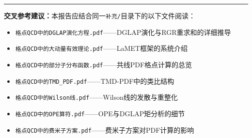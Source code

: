 \documentclass[12pt,a4paper]{ctexart}
\theoremstyle{definition}
\begin{document}
\vspace{0.5cm}
\noindent\rule{\textwidth}{0.5pt}
\small
\textbf{交叉参考建议：}本报告应结合同一\texttt{补充/}目录下的以下文件阅读：
\begin{itemize}[nosep]
    \item \texttt{格点QCD中的DGLAP演化方程.pdf}——DGLAP演化与RGR重求和的详细推导
    \item \texttt{格点QCD中的大动量有效理论.pdf}——LaMET框架的系统介绍
    \item \texttt{格点QCD中的部分子分布函数.pdf}——共线PDF格点计算的总览
    \item \texttt{格点QCD中的TMD\_PDF.pdf}——TMD-PDF中的类比结构
    \item \texttt{格点QCD中的Wilson线.pdf}——Wilson线的发散与重整化
    \item \texttt{格点QCD中的OPE算符.pdf}——OPE与DGLAP矩分析的细节
    \item \texttt{格点QCD中的费米子方案.pdf}——费米子方案对PDF计算的影响
\end{itemize}
\end{document}
